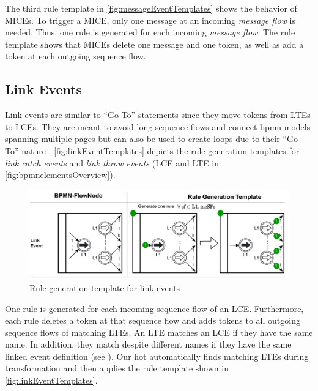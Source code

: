 \documentclass{lmcs} %
\theoremstyle{plain}\newtheorem{satz}[thm]{Satz} %
\begin{document}
The third rule template in \autoref{fig:messageEventTemplates} shows the behavior of MICEs.
To trigger a MICE, only one message at an incoming \textit{message flow} is needed.
Thus, one rule is generated for each incoming \textit{message flow}.
The rule template shows that MICEs delete one message and one token, as well as add a token at each outgoing sequence flow.




\subsection{Link Events}
Link events are similar to \enquote{Go To} statements since they move tokens from LTEs to LCEs.
They are meant to avoid long sequence flows and connect \gls{bpmn} models spanning multiple pages but can also be used to create loops due to their \enquote{Go To} nature \cite{objectmanagementgroupBusinessProcessModel2013}.
\autoref{fig:linkEventTemplates} depicts the rule generation templates for \textit{link catch events} and \textit{link throw events} (\textsf{LCE} and \textsf{LTE} in \autoref{fig:bpmnelementsOverview}).

\begin{figure}[ht]
    \centering
    \includegraphics[width=1\textwidth]{images/linkEvent_template.pdf}
    \caption{Rule generation template for link events}
    \label{fig:linkEventTemplates}
\end{figure}

One rule is generated for each incoming sequence flow of an LCE.
Furthermore, each rule deletes a token at that sequence flow and adds tokens to all outgoing sequence flows of matching LTEs.
An LTE matches an LCE if they have the same name.
In addition, they match despite different names if they have the same linked event definition (see \cite{objectmanagementgroupBusinessProcessModel2013}).
Our \gls*{hot} automatically finds matching LTEs during transformation and then applies the rule template shown in \autoref{fig:linkEventTemplates}.
\end{document}
